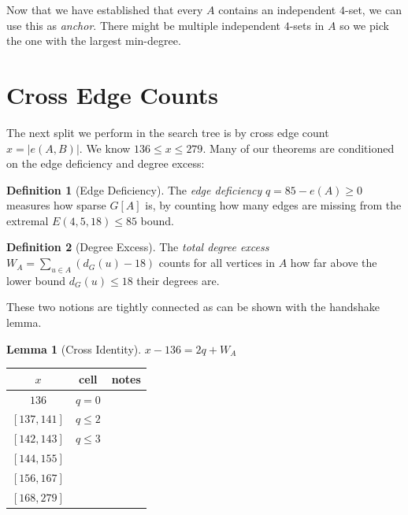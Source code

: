 \documentclass[a4paper]{article}
\theoremstyle{definition}
\newtheorem{definition}{Definition}
\newtheorem{lemma}{Lemma}
\begin{document}
Now that we have established that every $A$ contains an independent $4$-set,
we can use this as \emph{anchor}.
There might be multiple independent $4$-sets in $A$ so we pick the one with the largest min-degree.


\section{Cross Edge Counts}

The next split we perform in the search tree is by cross edge count $x = |e(A, B)|$.
We know $136 \leqslant x \leqslant 279$.
Many of our theorems are conditioned on the edge deficiency and degree excess:

\begin{definition}[Edge Deficiency]
	The \emph{edge deficiency} $q = 85 - e(A) \geqslant 0$ measures how sparse $G[A]$ is,
	by counting how many edges are missing from the extremal $E(4, 5, 18) \leqslant 85$ bound.
\end{definition}

\begin{definition}[Degree Excess]
	The \emph{total degree excess} $W_A = \sum_{u \in A} \left( d_G(u) - 18 \right)$ counts
	for all vertices in $A$ how far above the lower bound $d_G(u) \leqslant 18$ their degrees are.
\end{definition}

These two notions are tightly connected as can be shown with the handshake lemma.

\begin{lemma}[Cross Identity]
	$x - 136 = 2q + W_A$
\end{lemma}

\begin{center}
	\begin{tabular}{c|c|c}
		$x$          & cell            & notes \\
		\hline
		$136$        & $q=0$           &       \\
		$[137, 141]$ & $q \leqslant 2$ &       \\
		$[142, 143]$ & $q \leqslant 3$ &       \\
		$[144, 155]$ &                 &       \\
		$[156, 167]$ &                 &       \\
		$[168, 279]$ &                 &       \\
	\end{tabular}
\end{center}
\end{document}
